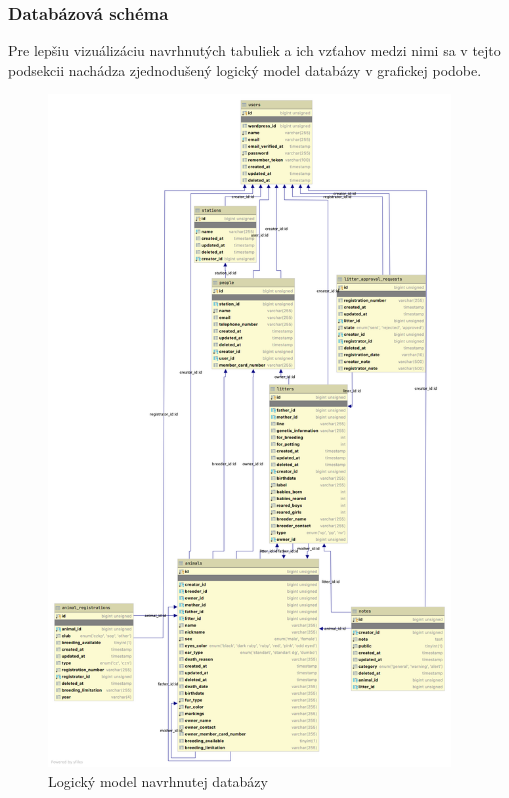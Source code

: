 \raggedbottom

\pagebreak

\subsubsection{Databázová schéma}
Pre lepšiu vizuálizáciu navrhnutých tabuliek a ich vzťahov medzi nimi sa v tejto podsekcii nachádza zjednodušený logický model databázy v grafickej podobe.

\raggedbottom

\begin{figure}[H]
	\includegraphics[height=178mm]{media/navrh/diagram.png}
	\caption{Logický model navrhnutej databázy}
\end{figure}
